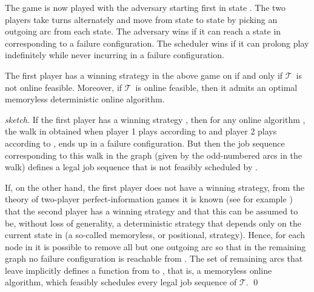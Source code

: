 \documentclass{llncs}
\newcommand{\tsys}{\ensuremath{\mathcal{T}}}
\begin{document}
The game is now played with the adversary starting first in state . The two players take turns alternately and move from state to state by picking an outgoing arc from each state. The adversary wins if it can reach a state in  corresponding to a failure configuration. The scheduler wins if it can prolong play indefinitely while never incurring in a failure configuration. 
\begin{lemma}
\label{lem:onlinefeas}
The first player has a winning strategy in the above game on  if and only if \tsys\ is not online feasible. Moreover, if \tsys\ is online feasible, then it admits an optimal memoryless deterministic online algorithm. 
\end{lemma}
\begin{proof}[sketch]
If the first player has a winning strategy , then for any online algorithm \alg, the walk in  obtained when player 1 plays according to  and player 2 plays according to \alg, ends up in a failure configuration. But then the job sequence corresponding to this walk in the graph (given by the odd-numbered arcs in the walk) defines a legal job sequence that is not feasibly scheduled by \alg. 

If, on the other hand, the first player does not have a winning strategy, from the theory of two-player perfect-information games it is known (see for example \cite{Graedel:2002,McNaughton:1993}) that the second player has a winning strategy and that this can be assumed to be, without loss of generality, a deterministic strategy that depends only on the current state in  (a so-called memoryless, or positional, strategy). Hence, for each node in  it is possible to remove all but one outgoing arc so that in the remaining graph no failure configuration is reachable from . The set of remaining arcs that leave  implicitly defines a function from  to , that is, a memoryless online algorithm, which feasibly schedules every legal job sequence of \tsys.
\qed  
\end{proof}
\end{document}
